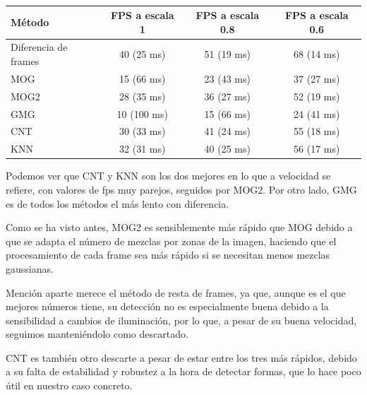 \begin{table}
    \centering
    \begin{tabular}{| l | c | c | c |}
    \hline
    \textbf{Método} & \textbf{FPS a escala 1} & \textbf{FPS a escala 0.8} & \textbf{FPS a escala 0.6}\\ \hline
    Diferencia de frames & 40 (25 ms) & 51 (19 ms) & 68 (14 ms) \\ \hline
    MOG & 15 (66 ms) & 23 (43 ms) & 37 (27 ms) \\ \hline
    MOG2 & 28 (35 ms) & 36 (27 ms) & 52 (19 ms) \\ \hline
    GMG & 10 (100 ms) & 15 (66 ms) & 24 (41 ms) \\ \hline
    CNT & 30 (33 ms) & 41 (24 ms) & 55 (18 ms)\\ \hline
    KNN & 32 (31 ms) & 40 (25 ms) & 56 (17 ms)\\ \hline
  \end{tabular}
  \caption{}
  \label{tab:1}
\end{table}

Podemos ver que CNT y KNN son los dos mejores en lo que a velocidad se refiere, con valores de fps muy parejos, seguidos por MOG2. Por otro lado, GMG es de todos los métodos el más lento con diferencia.

Como se ha visto antes, MOG2 es sensiblemente más rápido que MOG debido a que se adapta el número de mezclas por zonas de la imagen, haciendo que el procesamiento de cada frame sea más rápido si se necesitan menos mezclas gaussianas.

Mención aparte merece el método de resta de frames, ya que, aunque es el que mejores números tiene, su detección no es especialmente buena debido a la sensibilidad a cambios de iluminación, por lo que, a pesar de su buena velocidad, seguimos manteniéndolo como descartado.

CNT es también otro descarte a pesar de estar entre los tres más rápidos, debido a su falta de estabilidad y robustez a la hora de detectar formas, que lo hace poco útil en nuestro caso concreto. 

